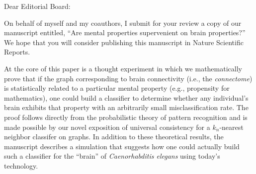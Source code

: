 \documentclass[10pt]{letter}
\date{\today}
\begin{document}
\begin{letter}{	%
}   
                           
\opening{Dear Editorial Board:}

On behalf of myself and my coauthors, I submit for your review a copy of our manuscript entitled, ``Are mental properties supervenient on brain properties?'' We hope that you will consider publishing this manuscript in Nature Scientific Reports.

At the core of this paper is a thought experiment in which we mathematically prove that if the graph corresponding to brain connectivity (i.e., the \emph{connectome}) is statistically related to a particular mental property (e.g., propensity for mathematics), one could build a classifier to determine whether any individual's brain exhibits that property with an arbitrarily small misclassification rate. The proof follows directly from the probabilistic theory of pattern recognition and is made possible by our novel exposition of universal consistency for a $k_n$-nearest neighbor classifer on graphs. In addition to these theoretical results, the manuscript describes a simulation that suggests how one could actually build such a classifier for the ``brain'' of \emph{Caenorhabditis elegans} using today's technology.


\end{letter}
\end{document}
